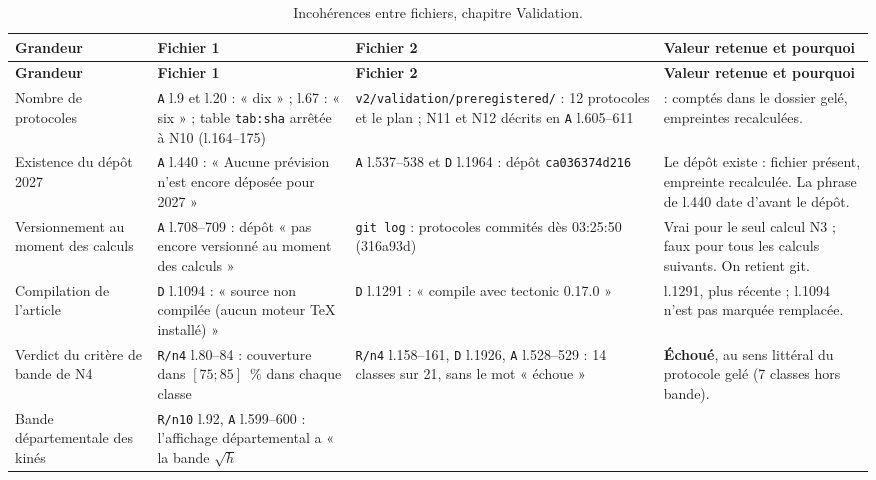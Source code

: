 {\footnotesize
\setlength{\tabcolsep}{3pt}
\renewcommand{\arraystretch}{1.15}
\begin{longtable}{@{}>{\raggedright\arraybackslash}p{2.6cm}>{\raggedright\arraybackslash}p{3.6cm}>{\raggedright\arraybackslash}p{3.6cm}>{\raggedright\arraybackslash}p{5.2cm}@{}}
\caption{Incohérences entre fichiers, chapitre Validation.}\label{val:tab-incoherences}\\
\toprule
\textbf{Grandeur} & \textbf{Fichier 1} & \textbf{Fichier 2} & \textbf{Valeur retenue et pourquoi} \\
\midrule
\endfirsthead
\toprule
\textbf{Grandeur} & \textbf{Fichier 1} & \textbf{Fichier 2} & \textbf{Valeur retenue et pourquoi} \\
\midrule
\endhead
\bottomrule
\endfoot
Nombre de protocoles &
\texttt{A} l.9 et l.20 : « dix » ; l.67 : « six » ; table \texttt{tab:sha} arrêtée à N10
(l.164--175) &
\texttt{v2/\allowbreak validation/\allowbreak preregistered/} : 12\mesure{} protocoles et le plan ; N11 et N12 décrits en
\texttt{A} l.605--611 &
12\mesure{} : comptés dans le dossier gelé, empreintes recalculées. \\
\addlinespace
Existence du dépôt 2027 &
\texttt{A} l.440 : « Aucune prévision n'est encore déposée pour 2027 » &
\texttt{A} l.537--538 et \texttt{D} l.1964 : dépôt \texttt{ca036374d216} &
Le dépôt existe : fichier présent, empreinte recalculée. La phrase de l.440 date d'avant le dépôt. \\
\addlinespace
Versionnement au moment des calculs &
\texttt{A} l.708--709 : dépôt « pas encore versionné au moment des calculs » &
\texttt{git log} : protocoles commités dès 03:25:50\mesure{} (316a93d) &
Vrai pour le seul calcul N3 ; faux pour tous les calculs suivants. On retient git. \\
\addlinespace
Compilation de l'article &
\texttt{D} l.1094 : « source non compilée (aucun moteur TeX installé) » &
\texttt{D} l.1291 : « compile avec tectonic 0.17.0 » &
l.1291, plus récente ; l.1094 n'est pas marquée remplacée. \\
\addlinespace
Verdict du critère de bande de N4 &
\texttt{R/n4} l.80--84 : couverture dans $[75 ; 85]$\suppose{}~\% dans chaque classe &
\texttt{R/n4} l.158--161, \texttt{D} l.1926, \texttt{A} l.528--529 : 14\mesure{} classes sur 21,
sans le mot « échoue » &
\textbf{Échoué}, au sens littéral du protocole gelé (7\derive{} classes hors bande). \\
\addlinespace
Bande départementale des kinés &
\texttt{R/n10} l.92, \texttt{A} l.599--600 : l'affichage départemental a « la bande $\sqrt h$

\end{longtable}}
